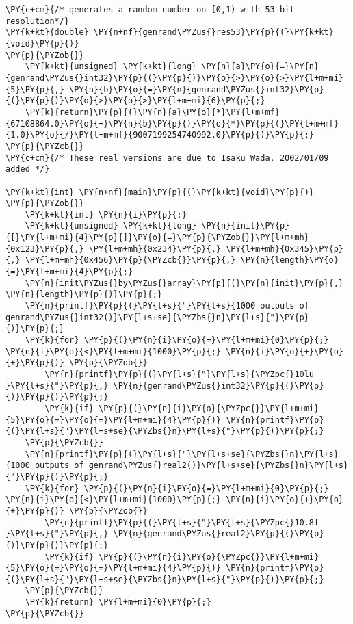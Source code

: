 \begin{Verbatim}[commandchars=\\\{\}]
\PY{c+cm}{/* generates a random number on [0,1) with 53-bit resolution*/}
\PY{k+kt}{double} \PY{n+nf}{genrand\PYZus{}res53}\PY{p}{(}\PY{k+kt}{void}\PY{p}{)} 
\PY{p}{\PYZob{}} 
	\PY{k+kt}{unsigned} \PY{k+kt}{long} \PY{n}{a}\PY{o}{=}\PY{n}{genrand\PYZus{}int32}\PY{p}{(}\PY{p}{)}\PY{o}{>}\PY{o}{>}\PY{l+m+mi}{5}\PY{p}{,} \PY{n}{b}\PY{o}{=}\PY{n}{genrand\PYZus{}int32}\PY{p}{(}\PY{p}{)}\PY{o}{>}\PY{o}{>}\PY{l+m+mi}{6}\PY{p}{;} 
	\PY{k}{return}\PY{p}{(}\PY{n}{a}\PY{o}{*}\PY{l+m+mf}{67108864.0}\PY{o}{+}\PY{n}{b}\PY{p}{)}\PY{o}{*}\PY{p}{(}\PY{l+m+mf}{1.0}\PY{o}{/}\PY{l+m+mf}{9007199254740992.0}\PY{p}{)}\PY{p}{;} 
\PY{p}{\PYZcb{}} 
\PY{c+cm}{/* These real versions are due to Isaku Wada, 2002/01/09 added */}

\PY{k+kt}{int} \PY{n+nf}{main}\PY{p}{(}\PY{k+kt}{void}\PY{p}{)}
\PY{p}{\PYZob{}}
	\PY{k+kt}{int} \PY{n}{i}\PY{p}{;}
	\PY{k+kt}{unsigned} \PY{k+kt}{long} \PY{n}{init}\PY{p}{[}\PY{l+m+mi}{4}\PY{p}{]}\PY{o}{=}\PY{p}{\PYZob{}}\PY{l+m+mh}{0x123}\PY{p}{,} \PY{l+m+mh}{0x234}\PY{p}{,} \PY{l+m+mh}{0x345}\PY{p}{,} \PY{l+m+mh}{0x456}\PY{p}{\PYZcb{}}\PY{p}{,} \PY{n}{length}\PY{o}{=}\PY{l+m+mi}{4}\PY{p}{;}
	\PY{n}{init\PYZus{}by\PYZus{}array}\PY{p}{(}\PY{n}{init}\PY{p}{,} \PY{n}{length}\PY{p}{)}\PY{p}{;}
	\PY{n}{printf}\PY{p}{(}\PY{l+s}{"}\PY{l+s}{1000 outputs of genrand\PYZus{}int32()}\PY{l+s+se}{\PYZbs{}n}\PY{l+s}{"}\PY{p}{)}\PY{p}{;}
	\PY{k}{for} \PY{p}{(}\PY{n}{i}\PY{o}{=}\PY{l+m+mi}{0}\PY{p}{;} \PY{n}{i}\PY{o}{<}\PY{l+m+mi}{1000}\PY{p}{;} \PY{n}{i}\PY{o}{+}\PY{o}{+}\PY{p}{)} \PY{p}{\PYZob{}}
		\PY{n}{printf}\PY{p}{(}\PY{l+s}{"}\PY{l+s}{\PYZpc{}10lu }\PY{l+s}{"}\PY{p}{,} \PY{n}{genrand\PYZus{}int32}\PY{p}{(}\PY{p}{)}\PY{p}{)}\PY{p}{;}
		\PY{k}{if} \PY{p}{(}\PY{n}{i}\PY{o}{\PYZpc{}}\PY{l+m+mi}{5}\PY{o}{=}\PY{o}{=}\PY{l+m+mi}{4}\PY{p}{)} \PY{n}{printf}\PY{p}{(}\PY{l+s}{"}\PY{l+s+se}{\PYZbs{}n}\PY{l+s}{"}\PY{p}{)}\PY{p}{;}
	\PY{p}{\PYZcb{}}
	\PY{n}{printf}\PY{p}{(}\PY{l+s}{"}\PY{l+s+se}{\PYZbs{}n}\PY{l+s}{1000 outputs of genrand\PYZus{}real2()}\PY{l+s+se}{\PYZbs{}n}\PY{l+s}{"}\PY{p}{)}\PY{p}{;}
	\PY{k}{for} \PY{p}{(}\PY{n}{i}\PY{o}{=}\PY{l+m+mi}{0}\PY{p}{;} \PY{n}{i}\PY{o}{<}\PY{l+m+mi}{1000}\PY{p}{;} \PY{n}{i}\PY{o}{+}\PY{o}{+}\PY{p}{)} \PY{p}{\PYZob{}}
		\PY{n}{printf}\PY{p}{(}\PY{l+s}{"}\PY{l+s}{\PYZpc{}10.8f }\PY{l+s}{"}\PY{p}{,} \PY{n}{genrand\PYZus{}real2}\PY{p}{(}\PY{p}{)}\PY{p}{)}\PY{p}{;}
		\PY{k}{if} \PY{p}{(}\PY{n}{i}\PY{o}{\PYZpc{}}\PY{l+m+mi}{5}\PY{o}{=}\PY{o}{=}\PY{l+m+mi}{4}\PY{p}{)} \PY{n}{printf}\PY{p}{(}\PY{l+s}{"}\PY{l+s+se}{\PYZbs{}n}\PY{l+s}{"}\PY{p}{)}\PY{p}{;}
	\PY{p}{\PYZcb{}}
	\PY{k}{return} \PY{l+m+mi}{0}\PY{p}{;}
\PY{p}{\PYZcb{}}
\end{Verbatim}
